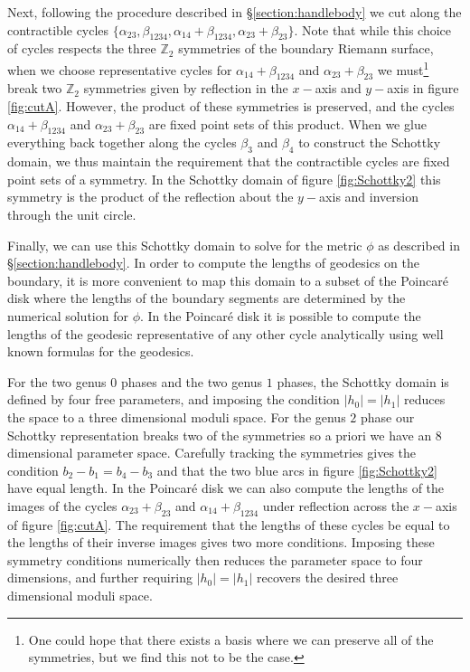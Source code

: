 \documentclass[letterpaper,12pt]{article}
\begin{document}
Next, following the procedure described in \S\ref{section:handlebody} we cut along the contractible cycles $\{\alpha_{23}, \beta_{1234}, \alpha_{14}+\beta_{1234}, \alpha_{23}+\beta_{23}\}$. Note that while this choice of cycles respects the three $\mathbb Z_2$ symmetries of the boundary Riemann surface, when we choose representative cycles for $\alpha_{14}+\beta_{1234}$ and $\alpha_{23}+\beta_{23}$ we must\footnote{One could hope that there exists a basis where we can preserve all of the symmetries, but we find this not to be the case.} break two $\mathbb Z_2$ symmetries given by reflection in the $x-$axis and $y-$axis in figure \ref{fig:cutA}. However, the product of these symmetries is preserved, and the cycles $\alpha_{14}+\beta_{1234}$ and $\alpha_{23}+\beta_{23}$ are fixed point sets of this product. When we glue everything back together along the cycles $\beta_3$ and $\beta_4$ to construct the Schottky domain, we thus maintain the requirement that the contractible cycles are fixed point sets of a symmetry. In the Schottky domain of figure \ref{fig:Schottky2} this symmetry is the product of the reflection about the $y-$axis and inversion through the unit circle.

Finally, we can use this Schottky domain to solve for the metric $\phi$ as described in \S\ref{section:handlebody}. In order to compute the lengths of geodesics on the boundary, it is more convenient to map this domain to a subset of the Poincar\'e disk where the lengths of the boundary segments are determined by the numerical solution for $\phi$. In the Poincar\'e disk it is possible to compute the lengths of the geodesic representative of any other cycle analytically using well known formulas for the geodesics.

For the two genus $0$ phases and the two genus $1$ phases, the Schottky domain is defined by four free parameters, and imposing the condition $|h_0| = |h_1|$ reduces the space to a three dimensional moduli space. For the genus $2$ phase our Schottky representation breaks two of the symmetries so a priori we have an $8$ dimensional parameter space.
Carefully tracking the symmetries gives the condition $b_2-b_1=b_4-b_3$ and that the two blue arcs in figure \ref{fig:Schottky2} have equal length.
In the Poincar\'e disk we can also compute the lengths of the images of the cycles $\alpha_{23}+\beta_{23}$ and $\alpha_{14}+\beta_{1234}$ under reflection across the $x-$axis of figure \ref{fig:cutA}. The requirement that the lengths of these cycles be equal to the lengths of their inverse images gives two more conditions. Imposing these symmetry conditions numerically then reduces the parameter space to four dimensions, and further requiring $|h_0|=|h_1|$ recovers the desired three dimensional moduli space.
\end{document}
